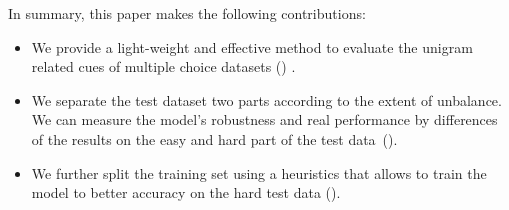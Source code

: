 
In summary, this paper makes the following contributions:
\begin{itemize}
\item We provide a light-weight and effective method to 
evaluate the unigram related cues of multiple choice datasets () .

\item We separate the test dataset two parts according to  
the extent of unbalance. 
We can measure the model's robustness and real performance 
by differences of the results on the easy and hard part of the test data~().
\item We further split the training set using a heuristics that allows to
train the model to better accuracy on the hard test data (). 

\end{itemize}


















